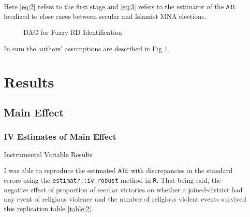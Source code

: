 \documentclass{scrartcl}
\begin{document}
Here \ref{eq:2} refers to the first stage and \ref{eq:3} refers to the estimator of the \texttt{ATE} localized to close races between secular and Islamist MNA elections.  

\begin{figure}[h]
  \centering
  \caption{DAG for Fuzzy RD Identification}
  \label{fig:iv-dag}
\end{figure}

In sum the authors' assumptions are described in Fig \ref{fig:iv-dag}

\section{Results}

\subsection{Main Effect}

\subsubsection{IV Estimates of Main Effect}

\begin{table}[ht]
  \begin{center}
    \scalebox{0.75}{
      
    }
    \caption{Instrumental Variable Results}
    \label{table:2}
  \end{center}
\end{table}

I was able to reproduce the estimated \texttt{ATE} with discrepancies in the standard errors using the \texttt{estimatr::iv\_robust} method in \texttt{R}.
That being said, the negative effect of proportion of secular victories on whether a joined-district had any event of religious violence and the number of religious violent events survived this replication table \ref{table:2}.
\end{document}
